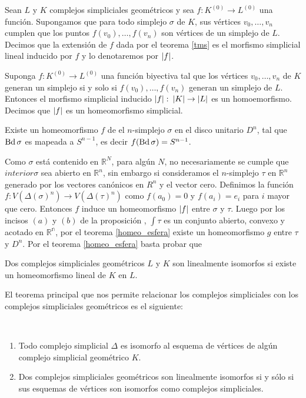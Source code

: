 \begin{Defi}
Sean $L$ y $K$ complejos simpliciales geométricos y sea $f\colon K^{(0)} \rightarrow L^{(0)}$ una función. Supongamos que  para todo simplejo $\sigma$ de $K$, sus vértices $v_0,\ldots,v_n$ cumplen que los puntos $f(v_0),\ldots,f(v_n)$ son vértices de un simplejo de $L$. Decimos que la extensión de $f$ dada por el teorema \ref{tms} es el morfismo simplicial lineal inducido por $f$ y lo denotaremos por $\left| f \right|$.
\end{Defi}
\begin{Teo}
Suponga $f:K^{(0)}\rightarrow L^{(0)}$ una función biyectiva tal que los vértices $v_0,\ldots,v_n$ de $K$ generan un simplejo si y solo si $f(v_0),\ldots,f(v_n)$ generan un simplejo de $L$. Entonces el morfismo simplicial inducido $\left| f \right|\colon \left| K \right|\rightarrow\left| L \right|$ es un homoemorfismo. Decimos que $\left| f \right|$ es un homeomorfismo simplicial.
\end{Teo}

\begin{Col}
\item Existe un homeomorfismo $f$ de el $n$-simplejo $\sigma$ en el disco unitario $D^n$, tal que $\operatorname{Bd} \sigma$ es mapeada a $S^{n-1}$, es decir $f(\operatorname{Bd} \sigma) = S^{n-1}$.
\end{Col}
\begin{Dem}
Como $\sigma$ está contenido en $\mathbb{R}^N$, para algún $N$, no necesariamente se cumple que $interior \sigma$ sea abierto en $\mathbb{R}^n$, sin embargo si consideramos el $n$-simplejo $\tau$ en $\mathbb{R}^n$ generado por los vectores canónicos en $R^n$ y el vector cero. Definimos la función $f\colon V(\Delta(\sigma)^n) \to V(\Delta(\tau)^n)$ como $f(a_0) = 0$ y $f(a_i) = e_i$ para $i$ mayor que cero. Entonces $f$ induce un homeomorfismo $\left| f \right|$ entre $\sigma$ y $\tau$.
Luego por los  incisos $(a)$ y  $(b)$ de la proposición , $\int \tau$ es un conjunto abierto, convexo y acotado en $\mathbb{R^{n}}$, por el teorema \ref{homeo_esfera} existe un homeomorfismo $g$ entre $\tau$ y $D^n$.
Por el teorema \ref{homeo_esfera} basta probar que 
\end{Dem}

\begin{Defi}
Dos complejos simpliciales geométricos $L$ y $K$ son linealmente isomorfos si existe un homeomorfismo lineal de $K$ en $L$.
\end{Defi}
El teorema principal que nos permite relacionar los complejos simpliciales con los complejos simpliciales geométricos es el siguiente:
\begin{Teo}\label{tpc} 
~\begin{enumerate}
\item Todo complejo simplicial $\Delta$ es isomorfo al esquema de vértices de algún complejo simplicial geométrico $K$.
\item Dos complejos simpliciales geométricos son linealmente isomorfos si y sólo si sus esquemas de vértices son isomorfos como complejos simpliciales.
\end{enumerate}
\end{Teo}

